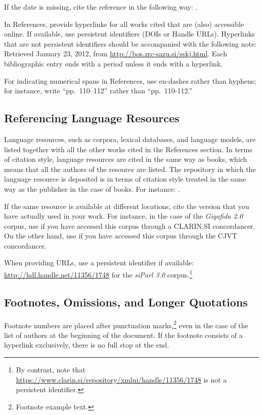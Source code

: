 \documentclass{article}
\begin{document}
If the date is missing, cite the reference in the following way: \parencite{slobench-ner}.

In References, provide hyperlinks for all works cited that are (also) accessible online. If available, use persistent identifiers (DOIs or Handle URLs). Hyperlinks that are not persistent identifiers should be accompanied with the following note: Retrieved January 23, 2012, from \url{http://bos.zrc-sazu.si/sskj.html}. Each bibliographic entry ends with a period unless it ends with a hyperlink.

For indicating numerical spans in References, use en-dashes rather than hyphens; for instance, write ``pp.\ 110--112'' rather than ``pp.\ 110-112.''

\subsection{Referencing Language Resources} 
Language resources, such as corpora, lexical databases, and language models, are listed together with all the other works cited in the References section. In terms of citation style, language resources are cited in the same way as books, which means that all the authors of the resource are listed. The repository in which the language resource is deposited is in terms of citation style treated in the same way as the publisher in the case of books. For instance: \parencite{parliamentaryCorpus}. 

If the same resource is available at different locations, cite the version that you have actually used in your work. For instance, in the case of the \textit{Gigafida 2.0} corpus, use \parencite{gigafida-clarin} if you have accessed this corpus through a CLARIN.SI concordancer. On the other hand, use \parencite{gigafida-cjvt} if you have accessed this corpus through the CJVT concordancer.

When providing URLs, use a persistent identifier if available: \url{http://hdl.handle.net/11356/1748} for the \textit{siParl 3.0} \parencite{parliamentaryCorpus} corpus.\footnote{By contrast, note that \url{https://www.clarin.si/repository/xmlui/handle/11356/1748} is not a persistent identifier.}

\subsection{Footnotes, Omissions, and Longer Quotations}

Footnote numbers are placed after punctuation marks,\footnote{Footnote example text.} even in the case of the list of authors at the beginning of the document. If the footnote consists of a hyperlink exclusively, there is no full stop at the end.
\end{document}
